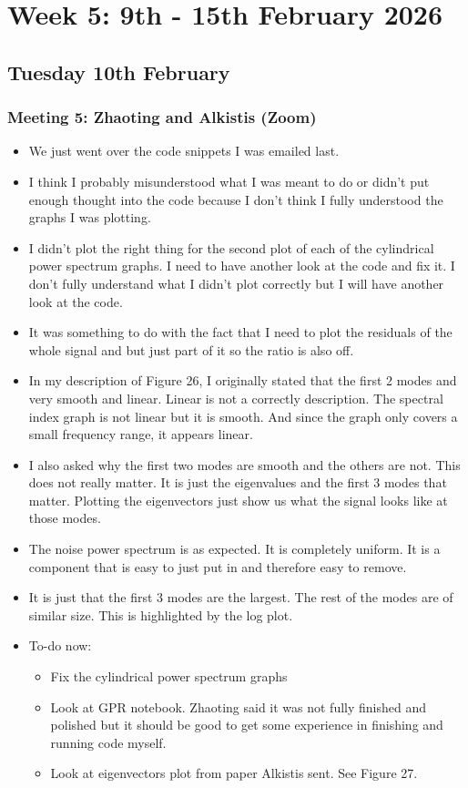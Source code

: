 \section{Week 5: 9th - 15th February 2026}

\subsection{Tuesday 10th February}

\subsubsection{Meeting 5: Zhaoting and Alkistis (Zoom)}

\begin{itemize}
    \item We just went over the code snippets I was emailed last.
    \item I think I probably misunderstood what I was meant to do or didn't put enough thought into the code because I don't think I fully understood the graphs I was plotting.
    \item I didn't plot the right thing for the second plot of each of the cylindrical power spectrum graphs. I need to have another look at the code and fix it. I don't fully understand what I didn't plot correctly but I will have another look at the code.
    \item It was something to do with the fact that I need to plot the residuals of the whole signal and but just part of it so the ratio is also off.
    \item In my description of Figure 26, I originally stated that the first 2 modes and very smooth and linear. Linear is not a correctly description. The spectral index graph is not linear but it is smooth. And since the graph only covers a small frequency range, it appears linear.
    \item I also asked why the first two modes are smooth and the others are not. This does not really matter. It is just the eigenvalues and the first 3 modes that matter. Plotting the eigenvectors just show us what the signal looks like at those modes.
    \item The noise power spectrum is as expected. It is completely uniform. It is a component that is easy to just put in and therefore easy to remove.
    \item It is just that the first 3 modes are the largest. The rest of the modes are of similar size. This is highlighted by the log plot.
    \item To-do now:
    \begin{itemize}
        \item Fix the cylindrical power spectrum graphs
        \item Look at GPR notebook. Zhaoting said it was not fully finished and polished but it should be good to get some experience in finishing and running code myself.
        \item Look at eigenvectors plot from paper Alkistis sent. See Figure 27.
    \end{itemize}
\end{itemize}
    
